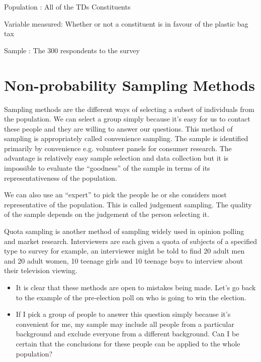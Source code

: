 ﻿\documentclass[]{report}
\begin{document}

Population : All of the TDs Constituents

Variable measured: Whether or not a constituent is in favour of the plastic bag tax

Sample : The 300 respondents to the survey








\section{Non-probability Sampling Methods}
Sampling methods are the different ways of selecting a subset of individuals from the population. We can select a group simply because it’s easy for us to contact these people and they are willing to answer our questions. This method of sampling is appropriately called convenience sampling. The sample is identified primarily by convenience e.g. volunteer panels for consumer research. The advantage is relatively easy sample selection and data collection but it is impossible to evaluate the “goodness” of the sample in terms of its representativeness of the population.

We can also use an “expert” to pick the people he or she considers most representative of the population. This is called judgement sampling. The quality of the sample depends on the judgement of the person selecting it.


Quota sampling is another method of sampling widely used in opinion polling and market research. Interviewers are each given a quota of subjects of a specified type to survey for example, an interviewer might be told to find 20 adult men and 20 adult women, 10 teenage girls and 10 teenage boys to interview about their television viewing. 


\begin{itemize}
\item It is clear that these methods are open to mistakes being made. Let’s go back to the example of the pre-election poll on who is going to win the election. 
\item If I pick a group of people to answer this question simply because it’s convenient for me, my sample may include all people from a particular background and exclude everyone from a different background. Can I be certain that the conclusions for these people can be applied to the whole population? 

\end{itemize}
\end{document}

